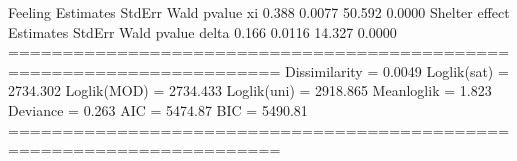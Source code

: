 \documentclass[letterpaper,10pt,english]{sphinxmanual}
\begin{document}
\begin{sphinxVerbatim}[commandchars=\\\{\}]
Feeling
       Estimates  StdErr    Wald  p\PYGZhy{}value
xi         0.388  0.0077  50.592   0.0000
\PYGZhy{}\PYGZhy{}\PYGZhy{}\PYGZhy{}\PYGZhy{}\PYGZhy{}\PYGZhy{}\PYGZhy{}\PYGZhy{}\PYGZhy{}\PYGZhy{}\PYGZhy{}\PYGZhy{}\PYGZhy{}\PYGZhy{}\PYGZhy{}\PYGZhy{}\PYGZhy{}\PYGZhy{}\PYGZhy{}\PYGZhy{}\PYGZhy{}\PYGZhy{}\PYGZhy{}\PYGZhy{}\PYGZhy{}\PYGZhy{}\PYGZhy{}\PYGZhy{}\PYGZhy{}\PYGZhy{}\PYGZhy{}\PYGZhy{}\PYGZhy{}\PYGZhy{}\PYGZhy{}\PYGZhy{}\PYGZhy{}\PYGZhy{}\PYGZhy{}\PYGZhy{}\PYGZhy{}\PYGZhy{}\PYGZhy{}\PYGZhy{}\PYGZhy{}\PYGZhy{}\PYGZhy{}\PYGZhy{}\PYGZhy{}\PYGZhy{}\PYGZhy{}\PYGZhy{}\PYGZhy{}\PYGZhy{}\PYGZhy{}\PYGZhy{}\PYGZhy{}\PYGZhy{}\PYGZhy{}\PYGZhy{}\PYGZhy{}\PYGZhy{}\PYGZhy{}\PYGZhy{}\PYGZhy{}\PYGZhy{}\PYGZhy{}\PYGZhy{}\PYGZhy{}\PYGZhy{}
Shelter effect
       Estimates  StdErr    Wald  p\PYGZhy{}value
delta      0.166  0.0116  14.327   0.0000
=======================================================================
Dissimilarity = 0.0049
Loglik(sat)   = \PYGZhy{}2734.302
Loglik(MOD)   = \PYGZhy{}2734.433
Loglik(uni)   = \PYGZhy{}2918.865
Mean\PYGZhy{}loglik   = \PYGZhy{}1.823
Deviance      = 0.263
\PYGZhy{}\PYGZhy{}\PYGZhy{}\PYGZhy{}\PYGZhy{}\PYGZhy{}\PYGZhy{}\PYGZhy{}\PYGZhy{}\PYGZhy{}\PYGZhy{}\PYGZhy{}\PYGZhy{}\PYGZhy{}\PYGZhy{}\PYGZhy{}\PYGZhy{}\PYGZhy{}\PYGZhy{}\PYGZhy{}\PYGZhy{}\PYGZhy{}\PYGZhy{}\PYGZhy{}\PYGZhy{}\PYGZhy{}\PYGZhy{}\PYGZhy{}\PYGZhy{}\PYGZhy{}\PYGZhy{}\PYGZhy{}\PYGZhy{}\PYGZhy{}\PYGZhy{}\PYGZhy{}\PYGZhy{}\PYGZhy{}\PYGZhy{}\PYGZhy{}\PYGZhy{}\PYGZhy{}\PYGZhy{}\PYGZhy{}\PYGZhy{}\PYGZhy{}\PYGZhy{}\PYGZhy{}\PYGZhy{}\PYGZhy{}\PYGZhy{}\PYGZhy{}\PYGZhy{}\PYGZhy{}\PYGZhy{}\PYGZhy{}\PYGZhy{}\PYGZhy{}\PYGZhy{}\PYGZhy{}\PYGZhy{}\PYGZhy{}\PYGZhy{}\PYGZhy{}\PYGZhy{}\PYGZhy{}\PYGZhy{}\PYGZhy{}\PYGZhy{}\PYGZhy{}\PYGZhy{}
AIC = 5474.87
BIC = 5490.81
=======================================================================
\end{sphinxVerbatim}

\noindent{}
\end{document}
